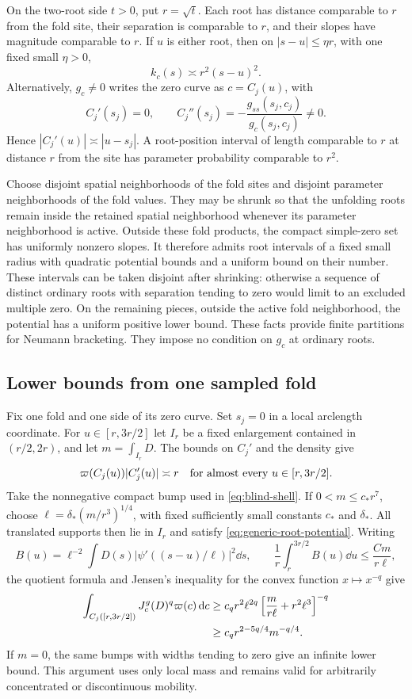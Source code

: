 On the two-root side $t>0$, put $r=\sqrt t$. Each root has distance
comparable to $r$ from the fold site, their separation is comparable
to $r$, and their slopes have magnitude comparable to $r$. If $u$ is
either root, then on $|s-u|\le\eta r$, with one fixed small $\eta>0$,
\begin{equation}\label{eq:generic-root-potential}
 k_c(s)\asymp r^2(s-u)^2.
\end{equation}
Alternatively, $g_c\ne0$ writes the zero curve as $c=C_j(u)$, with
\[
 C_j'(s_j)=0,\qquad
 C_j''(s_j)=-\frac{g_{ss}(s_j,c_j)}{g_c(s_j,c_j)}\ne0.
\]
Hence $|C_j'(u)|\asymp|u-s_j|$. A root-position interval of length
comparable to $r$ at distance $r$ from the site has parameter
probability comparable to $r^2$.

Choose disjoint spatial neighborhoods of the fold sites and disjoint
parameter neighborhoods of the fold values. They may be shrunk so that
the unfolding roots remain inside the retained spatial neighborhood
whenever its parameter neighborhood is active. Outside these fold
products, the compact simple-zero set has uniformly nonzero slopes.
It therefore admits root intervals of a fixed small radius with
quadratic potential bounds and a uniform bound on their number.
These intervals can be taken disjoint after shrinking: otherwise a
sequence of distinct ordinary roots with separation tending to zero
would limit to an excluded multiple zero. On the remaining pieces,
outside the active fold neighborhood, the potential has a uniform
positive lower bound. These facts provide finite partitions for
Neumann bracketing. They impose no condition on $g_c$ at ordinary roots.

\subsection{Lower bounds from one sampled fold}
Fix one fold and one side of its zero curve. Set $s_j=0$ in a local
arclength coordinate. For $u\in[r,3r/2]$ let $I_r$ be a fixed
enlargement contained in $(r/2,2r)$, and let $m=\int_{I_r}D$.
The bounds on $C_j'$ and the density give
\[
 \varpi(C_j(u))|C_j'(u)|\asymp r
 \quad\hbox{for almost every }u\in[r,3r/2].
\]
Take the nonnegative compact bump used in \eqref{eq:blind-shell}.
If $0<m\le c_*r^7$, choose
$\ell=\delta_*(m/r^3)^{1/4}$, with fixed sufficiently small
constants $c_*$ and $\delta_*$.
All translated supports then lie in $I_r$ and satisfy
\eqref{eq:generic-root-potential}. Writing
\[
 B(u)=\ell^{-2}\int D(s)|\psi'((s-u)/\ell)|^2\dd s,
 \qquad \frac1r\int_r^{3r/2}B(u)\dd u\le\frac{Cm}{r\ell},
\]
the quotient formula and Jensen's inequality for the convex function
$x\mapsto x^{-q}$ give
\begin{align}
 \int_{C_j([r,3r/2])} J_c^g(D)^q\varpi(c)\,\mathrm d c
 &\ge c_q r^2\ell^{2q}
       \left[\frac{m}{r\ell}+r^2\ell^3\right]^{-q}\notag\\
 &\ge c_q r^{2-5q/4}m^{-q/4}.
 \label{eq:generic-shell}
\end{align}
If $m=0$, the same bumps with widths tending to zero give an infinite
lower bound. This argument uses only local mass and remains valid for
arbitrarily concentrated or discontinuous mobility.

